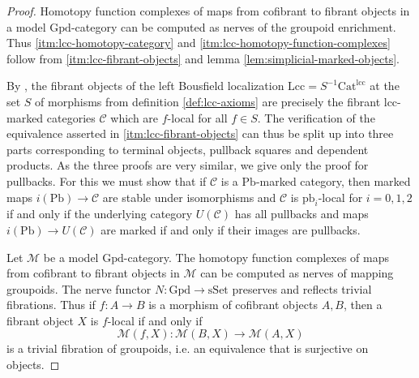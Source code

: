 \documentclass[a4paper]{article}
\theoremstyle{remark}
\theoremstyle{definition}
\begin{document}
\begin{proof}
  Homotopy function complexes of maps from cofibrant to fibrant objects in a model $\mathrm{Gpd}$-category can be computed as nerves of the groupoid enrichment.
  Thus \ref{itm:lcc-homotopy-category} and \ref{itm:lcc-homotopy-function-complexes} follow from \ref{itm:lcc-fibrant-objects} and lemma \ref{lem:simplicial-marked-objects}.

  By \citet[Theorem 4.1.1]{hirschhorn}, the fibrant objects of the left Bousfield localization $\mathrm{Lcc} = S^{-1} \mathrm{Cat}^{\mathrm{lcc}}$ at the set $S$ of morphisms from definition \ref{def:lcc-axioms} are precisely the fibrant lcc-marked categories $\mathcal{C}$ which are $f$-local for all $f \in S$.
  The verification of the equivalence asserted in \ref{itm:lcc-fibrant-objects} can thus be split up into three parts corresponding to terminal objects, pullback squares and dependent products.
  As the three proofs are very similar, we give only the proof for pullbacks.
  For this we must show that if $\mathcal{C}$ is a $\mathrm{Pb}$-marked category, then marked maps $i(\mathrm{Pb}) \rightarrow \mathcal{C}$ are stable under isomorphisms and $\mathcal{C}$ is $\mathrm{pb}_i$-local for $i = 0, 1, 2$ if and only if the underlying category $U(\mathcal{C})$ has all pullbacks and maps $i(\mathrm{Pb}) \rightarrow U(\mathcal{C})$ are marked if and only if their images are pullbacks.

  Let $\mathcal{M}$ be a model $\mathrm{Gpd}$-category.
  The homotopy function complexes of maps from cofibrant to fibrant objects in $\mathcal{M}$ can be computed as nerves of mapping groupoids.
  The nerve functor $N : \mathrm{Gpd} \rightarrow \mathrm{sSet}$ preserves and reflects trivial fibrations.
  Thus if $f : A \rightarrow B$ is a morphism of cofibrant objects $A, B$, then a fibrant object $X$ is $f$-local if and only if
  \begin{equation}
    \label{eq:locality}
    \mathcal{M}(f, X) : \mathcal{M}(B, X) \rightarrow \mathcal{M}(A, X)
  \end{equation}
  is a trivial fibration of groupoids, i.e. an equivalence that is surjective on objects.
  

\end{proof}
\end{document}

